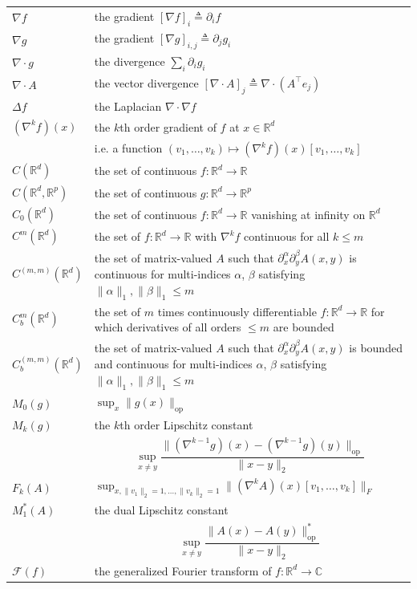 \documentclass[12pt,paper=letter]{scrreprt}
\def\R{\mathbb{R}}
\def\defeq{\triangleq} %
\newcommand{\FTop}[0]{\mathscr{F}} %
\begin{document}
\begin{longtable*}{p{.20\textwidth} p{.70\textwidth} }
$\nabla f$ & the gradient $[\nabla f]_i \defeq \partial_i f$  \\
$\nabla g$ & the gradient $[\nabla g]_{i,j} \defeq \partial_j g_i$ \\
$\nabla \cdot g$ & the divergence $\sum_i \partial_i g_i$ \\
$\nabla \cdot A$ & the vector divergence $[\nabla \cdot A]_j \defeq \nabla \cdot (A^\top e_j)$ \\
$\Delta f$ & the Laplacian $\nabla \cdot \nabla f$  \\
$(\nabla^k f)(x)$ & the $k$th order gradient of $f$ at $x \in \mathbb{R}^d$ \\
&  i.e. a function $(v_1 , \dots , v_k) \mapsto (\nabla^k f)(x)[v_1 , \dots , v_k]$ \\
$C(\mathbb{R}^d)$ & the set of continuous $f : \mathbb{R}^d \rightarrow \mathbb{R}$ \\
$C(\mathbb{R}^d,\mathbb{R}^p)$ & the set of continuous $g : \mathbb{R}^d \rightarrow \mathbb{R}^p$ \\
$C_0(\R^d)$ & the set of continuous $f : \mathbb{R}^d \rightarrow \mathbb{R}$ vanishing at infinity on $\mathbb{R}^d$ \\
$C^m(\mathbb{R}^d)$ & the set of $f : \mathbb{R}^d \rightarrow \mathbb{R}$ with $\nabla^k f$ continuous for all $k \leq m$ \\
$C^{(m,m)}(\mathbb{R}^d)$ & the set of matrix-valued $A$ such that $\partial_x^\alpha \partial_y^\beta A(x,y)$ is continuous for multi-indices $\alpha$, $\beta$ satisfying $\|\alpha\|_1, \|\beta\|_1 \leq m$ \\
$C_b^m(\mathbb{R}^d)$ & the set of $m$ times continuously differentiable $f : \mathbb{R}^d \rightarrow \mathbb{R}$ for which derivatives of all orders $\leq m$ are bounded \\
$C^{(m,m)}_b(\mathbb{R}^d)$ & the set of matrix-valued $A$ such that $\partial_x^\alpha \partial_y^\beta A(x,y)$ is bounded and continuous for multi-indices $\alpha$, $\beta$ satisfying $\|\alpha\|_1, \|\beta\|_1 \leq m$ \\
$M_0(g)$ & $\sup_{x} \|g(x)\|_{\mathrm{op}}$ \\
$M_k(g)$ & the $k$th order Lipschitz constant \\
 & $$\sup_{x \neq y} \frac{ \|(\nabla^{k-1} g)(x) - (\nabla^{k-1} g)(y)\|_{\mathrm{op}}}{\|x-y\|_2}$$ \\
$F_k(A)$ & $\sup_{x, \|v_1\|_2 = 1 , \dots , \|v_k\|_2 = 1} \| (\nabla^k A)(x)[v_1 , \dots , v_k] \|_F$ \\
$M_1^*(A)$ & the dual Lipschitz constant \\
 & $$\sup_{x \neq y} \frac{ \| A(x) - A(y)\|_{\mathrm{op}}^*}{\|x-y\|_2}$$ \\
$\FTop(f)$ & the generalized Fourier transform of $f : \mathbb{R}^d \rightarrow \mathbb{C}$
\end{longtable*}
\end{document}
